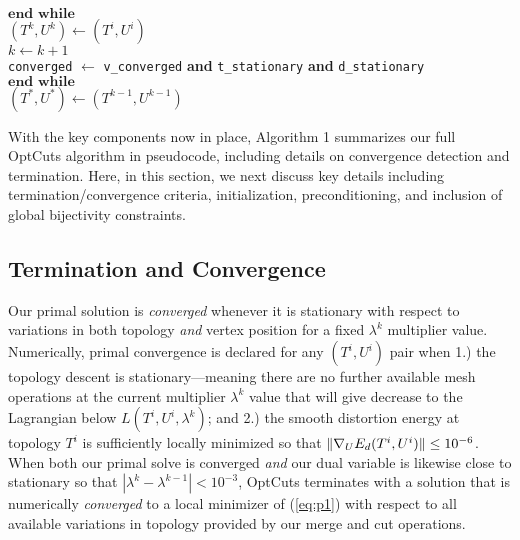 \begin{algorithm}[t]
\hspace{10pt} $\textbf{end while}$ \\

\hspace{10pt}  $(T^{k},U^{k}) \leftarrow (T^{i},U^{i})$ \\

\hspace{10pt} $k \leftarrow k + 1$ \\

\hspace{10pt} \texttt{converged} $\leftarrow$ \texttt{v\_converged} \textbf{and}   \texttt{t\_stationary}  \textbf{and} \texttt{d\_stationary} \\

 $\textbf{end while}$ \\
 
 $(T^{*},U^{*}) \leftarrow (T^{k-1},U^{k-1})$

\end{algorithm}

With the key components now in place, Algorithm 1 summarizes our full OptCuts algorithm in pseudocode, including details on convergence detection and termination. Here, in this section, we next discuss key details including termination/convergence criteria, initialization, preconditioning, and inclusion of global bijectivity constraints.


\subsection{Termination and Convergence}
\label{sec:term}

Our primal solution is \emph{converged} whenever it is stationary with respect to variations in both topology \emph{and} vertex position for a fixed $\lambda^k$ multiplier value. Numerically, primal convergence is declared for any $(T^i,U^i)$ pair when 1.) the topology descent is stationary---meaning there are no further available mesh operations at the current multiplier $\lambda^k$ value that will give decrease to the Lagrangian below $L(T^i,U^i,\lambda^k)$;
and 2.) the smooth distortion energy at topology $T^i$ is sufficiently locally minimized so that $\| \nabla_{\small{U}} E_{d}(T^i,U^i)\| \leq 10^{-6}$. When both our primal solve is converged \emph{and} our dual variable is likewise close to stationary so that $| \lambda^k -  \lambda^{k-1}| < 10^{-3}$, OptCuts terminates with a solution that is numerically \emph{converged} to a local minimizer of (\ref{eq:p1}) with respect to all available variations in topology provided by our merge and cut operations. 

